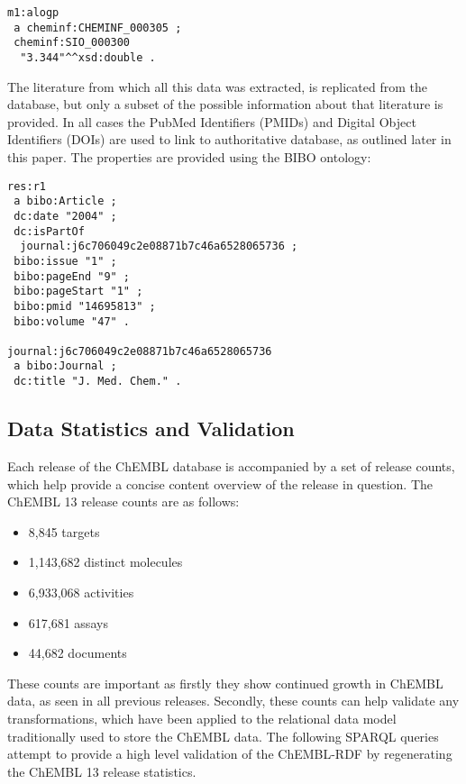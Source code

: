 \documentclass[10pt]{bmc_article}
\newenvironment{bmcformat}{\begin{raggedright}\baselineskip20pt\sloppy\setboolean{publ}{false}}{\end{raggedright}\baselineskip20pt\sloppy}
\begin{document}
\begin{bmcformat}
\begin{small}
\begin{verbatim}
m1:alogp
 a cheminf:CHEMINF_000305 ;
 cheminf:SIO_000300
  "3.344"^^xsd:double .
\end{verbatim}
\end{small}

The literature from which all this data was extracted, is replicated from the database,
but only a subset of the possible information about that literature is provided. In all cases 
the PubMed Identifiers (PMIDs) and Digital Object Identifiers (DOIs) are used to link
to authoritative database, as outlined later in this paper.
The properties are provided using the BIBO ontology:

\begin{small}
\begin{verbatim}
res:r1
 a bibo:Article ;
 dc:date "2004" ;
 dc:isPartOf
  journal:j6c706049c2e08871b7c46a6528065736 ;
 bibo:issue "1" ;
 bibo:pageEnd "9" ;
 bibo:pageStart "1" ;
 bibo:pmid "14695813" ;
 bibo:volume "47" .

journal:j6c706049c2e08871b7c46a6528065736
 a bibo:Journal ;
 dc:title "J. Med. Chem." .
\end{verbatim}
\end{small}

\subsection*{Data Statistics and Validation}

Each release of the ChEMBL database is accompanied by a set of release counts, which help 
provide a concise content overview of the release in question. The ChEMBL 13 release counts
are as follows:
\begin{itemize}
  \item 8,845 targets
  \item 1,143,682 distinct molecules
  \item 6,933,068 activities
  \item 617,681 assays
  \item 44,682 documents
\end{itemize}

These counts are important as firstly they show continued growth in ChEMBL data, as seen 
in all previous releases. Secondly, these counts can help validate any transformations, 
which have been applied to the relational data model traditionally used to store the ChEMBL 
data.  The following SPARQL queries attempt to provide a high level validation of the 
ChEMBL-RDF by regenerating the ChEMBL 13 release statistics.


\end{bmcformat}
\end{document}
